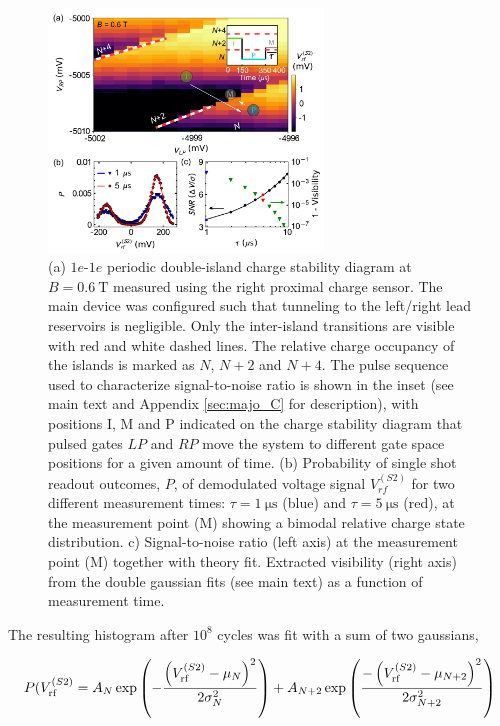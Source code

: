 \begin{figure}
	\includegraphics[width=0.65\textwidth]{Fig5-44.pdf}
	\caption[Charge sensitivity and signal-to-noise ratio]{(a) $1e$-$1e$ periodic double-island charge stability diagram at $B = \SI{0.6}{\tesla}$ measured using the right proximal charge sensor. The main device was configured such that tunneling to the left/right lead reservoirs is negligible. Only the inter-island transitions are visible with red and white dashed lines. The relative charge occupancy of the islands is marked as $N$, $N+2$ and $N+4$. The pulse sequence used to characterize signal-to-noise ratio is shown in the inset (see main text and Appendix \ref{sec:majo_C} for description), with positions I, M and P indicated on the charge stability diagram that pulsed gates $LP$ and $RP$ move the system to different gate space positions for a given amount of time. (b) Probability of single shot readout outcomes, $P$, of demodulated voltage signal $V^{(S2)}_{rf}$ for two different measurement times: $\tau = \SI{1}{\micro\second}$ (blue) and $\tau = \SI{5}{\micro\second}$ (red), at the measurement point (M) showing a bimodal relative charge state distribution. c) Signal-to-noise ratio (left axis) at the measurement point (M) together with theory fit. Extracted visibility (right axis) from the double gaussian fits (see main text) as a function of measurement time.}
	\label{fig:majo_e}
\end{figure}

The resulting histogram after $10^{8}$ cycles was fit with a sum of two gaussians,

\begin{equation}
\label{gaussians}
P(V_\textrm{rf}^{(S2)} = A_{N}\exp\left(-\frac{\left(V_{\rm rf}^{(S2)}-\mu_{N}\right)^{2}}{2\sigma_{N}^{2}}\right)
						+ A_{N+2}\exp\left(\frac{-\left(V_{\rm rf}^{(S2)}-\mu_{N+2}\right)^{2}}{2\sigma_{N+2}^{2}}\right)
\end{equation}

